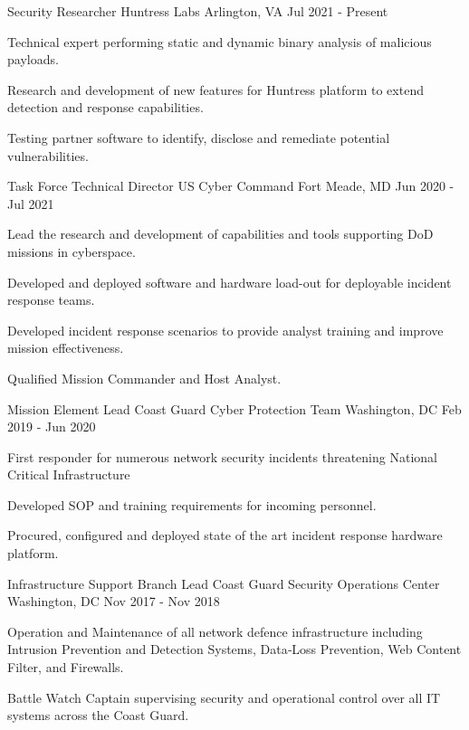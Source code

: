 \documentclass[11pt, letterpaper]{awesome-cv}
\begin{document}
\begin{cventries}


  \cventry
    {Security Researcher}
    {Huntress Labs}
    {Arlington, VA}
    {Jul 2021 - Present}
    {
      \begin{cvitems}
        \item{Technical expert performing static and dynamic binary analysis of malicious payloads.}
        \item{Research and development of new features for Huntress platform to extend detection and response capabilities.}
        \item{Testing partner software to identify, disclose and remediate potential vulnerabilities.}
      \end{cvitems}
    }


  \cventry
    {Task Force Technical Director}
    {US Cyber Command}
    {Fort Meade, MD}
    {Jun 2020 - Jul 2021}
    {
      \begin{cvitems}
        \item{Lead the research and development of capabilities and tools supporting DoD missions in cyberspace.}
        \item{Developed and deployed software and hardware load-out for deployable incident response teams.}
        \item{Developed incident response scenarios to provide analyst training and improve mission effectiveness.}
        \item{Qualified Mission Commander and Host Analyst.}
      \end{cvitems}
    }


  \cventry
    {Mission Element Lead}
    {Coast Guard Cyber Protection Team}
    {Washington, DC}
    {Feb 2019 - Jun 2020}
    {
      \begin{cvitems}
        \item{First responder for numerous network security incidents threatening National Critical Infrastructure}
        \item{Developed SOP and training requirements for incoming personnel.}
        \item{Procured, configured and deployed state of the art incident response hardware platform.}
      \end{cvitems}
    }


  \cventry
    {Infrastructure Support Branch Lead}
    {Coast Guard Security Operations Center}
    {Washington, DC}
    {Nov 2017 - Nov 2018}
    {
      \begin{cvitems}
        \item{Operation and Maintenance of all network defence infrastructure including Intrusion Prevention and Detection Systems, Data‑Loss Prevention, Web Content Filter, and Firewalls.}
        \item{Battle Watch Captain supervising security and operational control over all IT systems across the Coast Guard.}
      \end{cvitems}
    }



\end{cventries}
\end{document}
